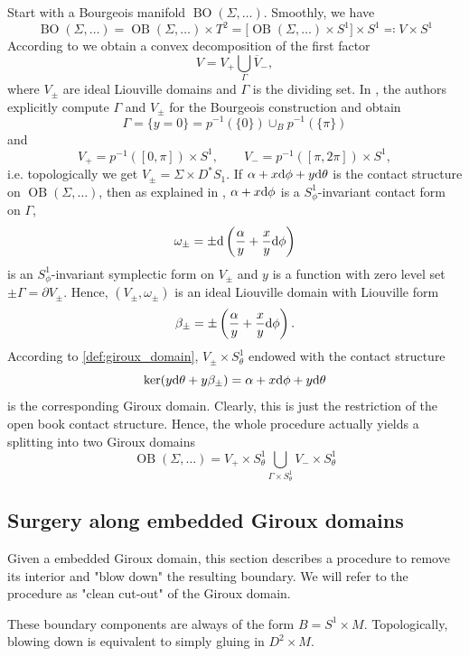 Start with a Bourgeois manifold $\operatorname{BO}(\Sigma,\dots)$.
Smoothly, we have
\[
    \operatorname{BO}(\Sigma,\dots) = \operatorname{OB}(\Sigma, \dots) \times T^2 
    = \big[\operatorname{OB}(\Sigma, \dots) \times S^1\big] \times S^1 
    \eqqcolon V \times S^1
\]
According to \cite[Section 6]{DG12} we obtain a convex decomposition of the first factor
\[
    V = V_+ \bigcup_\Gamma \overline{V}_-,
\]
where $V_\pm$ are ideal Liouville domains and $\Gamma$ is the dividing set.
In \cite[Section 5.3]{DG12}, the authors explicitly compute $\Gamma$ and 
$V_\pm$ for the Bourgeois construction and obtain %
\[
    \Gamma = \{y = 0\} = p^{-1}(\{0\}) \cup_B p^{-1}(\{\pi\})
\]
and
\[
    V_+ = p^{-1}([0, \pi]) \times S^1, \qquad V_- = p^{-1}([\pi, 2\pi]) \times S^1,
\]
i.e. topologically we get $V_\pm = \Sigma \times D^*S_1$.
If $\alpha + x \mathrm{d} \phi + y \mathrm{d} \theta$ is the contact structure on $\operatorname{OB}(\Sigma, \dots)$,
then as explained in \cite[Section 5.3]{DG12}, $\alpha + x \mathrm{d} \phi$ is a 
$S^1_\phi$-invariant contact form on $\Gamma$,
\[
    \omega_\pm = \pm \mathrm{d} \left(\frac{\alpha}{y} + \frac{x}{y}\mathrm{d} \phi\right) 
\]
is an $S^1_\phi$-invariant symplectic form on $V_\pm$ and
$y$ is a function with zero level set $\pm \Gamma = \partial V_\pm$.
Hence, $(V_\pm, \omega_\pm)$ is an ideal Liouville domain with Liouville form
\[
    \beta_\pm = \pm \left(\frac{\alpha}{y} + \frac{x}{y}\mathrm{d} \phi\right).
\]
According to \cref{def:giroux_domain}, $V_\pm \times S^1_\theta$
endowed with the contact structure 
\[
    \ker(y \mathrm{d} \theta + y \beta_\pm) = \alpha + x \mathrm{d} \phi + y \mathrm{d} \theta
\]
is the corresponding Giroux domain. Clearly, this is just the restriction
of the open book contact structure. Hence, the whole procedure actually yields a
splitting into two Giroux domains
\[
    \operatorname{OB}(\Sigma, \dots) = V_+ \times S^1_\theta 
    \bigcup_{\Gamma \times S^1_\theta} V_- \times S^1_\theta
\]

\subsection*{Surgery along embedded Giroux domains}
Given a embedded Giroux domain, this section describes a procedure
to remove its interior and "blow down" the resulting boundary.
We will refer to the procedure as "clean cut-out" of the Giroux domain.

These boundary components are always of the form $B = S^1 \times M$.
Topologically, blowing down is equivalent to simply gluing in $D^2 \times M$.

